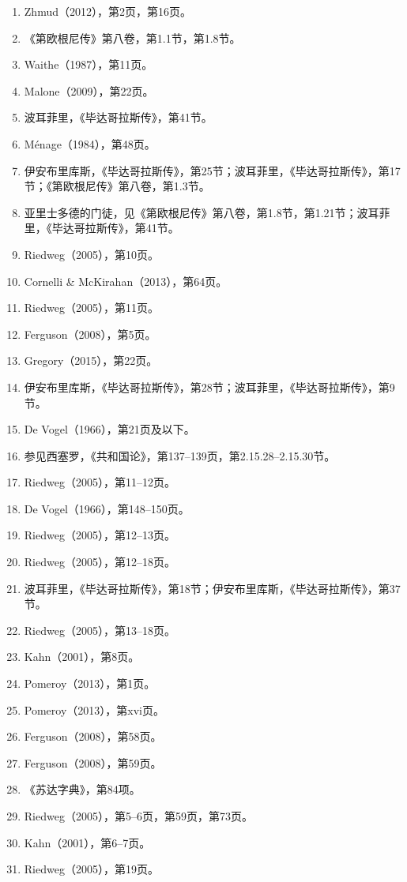 \begin{enumerate}
\item Zhmud（2012），第2页，第16页。  
\item 《第欧根尼传》第八卷，第1.1节，第1.8节。  
\item Waithe（1987），第11页。  
\item Malone（2009），第22页。  
\item 波耳菲里，《毕达哥拉斯传》，第41节。  
\item Ménage（1984），第48页。  
\item 伊安布里库斯，《毕达哥拉斯传》，第25节；波耳菲里，《毕达哥拉斯传》，第17节；《第欧根尼传》第八卷，第1.3节。  
\item 亚里士多德的门徒，见《第欧根尼传》第八卷，第1.8节，第1.21节；波耳菲里，《毕达哥拉斯传》，第41节。  
\item Riedweg（2005），第10页。  
\item Cornelli & McKirahan（2013），第64页。  
\item Riedweg（2005），第11页。  
\item Ferguson（2008），第5页。  
\item Gregory（2015），第22页。  
\item 伊安布里库斯，《毕达哥拉斯传》，第28节；波耳菲里，《毕达哥拉斯传》，第9节。  
\item De Vogel（1966），第21页及以下。  
\item 参见西塞罗，《共和国论》，第137–139页，第2.15.28–2.15.30节。  
\item Riedweg（2005），第11–12页。  
\item De Vogel（1966），第148–150页。  
\item Riedweg（2005），第12–13页。  
\item Riedweg（2005），第12–18页。  
\item 波耳菲里，《毕达哥拉斯传》，第18节；伊安布里库斯，《毕达哥拉斯传》，第37节。  
\item Riedweg（2005），第13–18页。  
\item Kahn（2001），第8页。  
\item Pomeroy（2013），第1页。  
\item Pomeroy（2013），第xvi页。  
\item Ferguson（2008），第58页。  
\item Ferguson（2008），第59页。  
\item 《苏达字典》，第84项。  
\item Riedweg（2005），第5–6页，第59页，第73页。  
\item Kahn（2001），第6–7页。  
\item Riedweg（2005），第19页。  

\end{enumerate}
